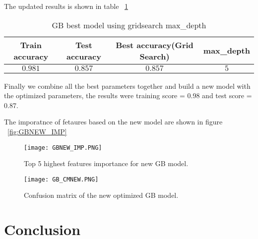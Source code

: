 \documentclass{article}
\begin{document}
The updated results is shown in table ~\ref{table:5}
\begin{table}[H]
	\centering
	\begin{tabular}{|c| c| c| c|} 
		\hline
		Train accuracy & Test accuracy & Best accuracy(Grid Search)  & max\_depth \\ 
		\hline\hline
		$ 0.981$ & $0.857$ & $0.857$ & $5$  \\ 
		\hline
	\end{tabular}
	\caption{{\small GB best model using gridsearch max\_depth }}
	\label{table:5}
\end{table}

Finally we combine all the best parameters together and build a new model with the optimized parameters, the results were training score = 0.98 and test score = 0.87.

The imporatnce of fetaures based on the new model are shown in figure ~\ref{fig:GBNEW_IMP}
\begin{figure}[H]
	\centering
	\begin{minipage}{0.45\textwidth}
		\centering
		\texttt{[image: GBNEW\_IMP.PNG]}\caption{{\small Top 5 highest features importance for  new GB model. }}
		\label{fig:GBNEW_IMP}
	\end{minipage}\hfill
	\begin{minipage}{0.45\textwidth}
		\centering
		\texttt{[image: GB\_CMNEW.PNG]}\caption{{\small Confusion matrix of the new optimized GB model.}}
		\label{fig:GB_CMNEW}
	\end{minipage}
\end{figure}
\section{Conclusion}
\end{document}
